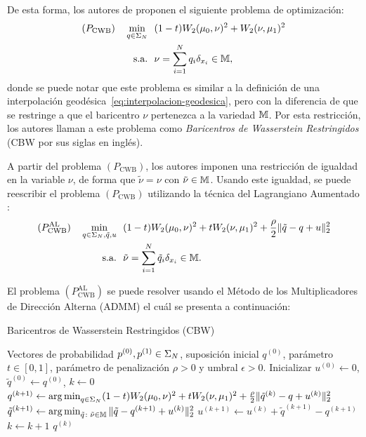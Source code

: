 De esta forma, los autores de \cite{simon2020barycenters} proponen el siguiente problema de optimización:
\begin{align*}
    (P_{\mathrm{CWB}}) \quad
    \min_{q \in \Simplex[N]} & \ \ (1-t) \Wasserstein[2]{\mu_0}{\nu}^2 + \Wasserstein[2]{\nu}{\mu_1}^2 \\
    \text{s.a.}              & \ \ \nu = \sum_{i=1}^{N} q_i \delta_{x_i} \in \bM,
\end{align*}
donde se puede notar que este problema es similar a la definición de una interpolación geodésica~\eqref{eq:interpolacion-geodesica}, pero con la diferencia de que se restringe a que el baricentro $\nu$ pertenezca a la variedad $\bM$. Por esta restricción, los autores llaman a este problema como \textit{Baricentros de Wasserstein Restringidos} (CBW por sus siglas en inglés).

A partir del problema $(P_{\mathrm{CWB}})$, los autores imponen una restricción de igualdad en la variable $\nu$, de forma que $\tilde \nu = \nu$ con $\tilde \nu \in \bM$. Usando este igualdad, se puede reescribir el problema $(P_{\mathrm{CWB}})$ utilizando la técnica del Lagrangiano Aumentado \cite[Sec. 2.3]{boyd2011distributed}:
\begin{align*}
    (P_{\mathrm{CWB}}^{\mathrm{AL}}) \quad
    \min_{q\in\Simplex[N],\tilde q,u} & \ \ (1-t) \Wasserstein[2]{\mu_0}{\nu}^2 + t \Wasserstein[2]{\nu}{\mu_1}^2
    + \frac{\rho}{2} \| \tilde q - q + u \|_2^2                                                                   \\
    \text{s.a.}                       & \ \ \tilde \nu = \sum_{i=1}^{N} \tilde q_i \delta_{x_i} \in \bM.
\end{align*}

El problema $(P_{\mathrm{CWB}}^{\mathrm{AL}})$ se puede resolver usando el Método de los Multiplicadores de Dirección Alterna (ADMM) \cite[Cap. 3]{boyd2011distributed} el cuál se presenta a continuación:

\begin{algorithm}[H]
    \caption{Baricentros de Wasserstein Restringidos (CBW)}\label{alg:ADMM-CWB}
    \begin{algorithmic}[1]
        \Require Vectores de probabilidad $p^{(0)}, p^{(1)} \in \Simplex[N]$, suposición inicial $q^{(0)}$, parámetro $t\in[0, 1]$, parámetro de penalización $\rho>0$ y umbral $\epsilon>0$.
        \State Inicializar $u^{(0)} \gets 0$, $\tilde q^{(0)} \gets q^{(0)}$, $k \gets 0$
        \Repeat
        \State $q^{(k+1)} \gets \argmin_{q\in\Simplex[N]}  (1-t) \Wasserstein[2]{\mu_0}{\nu}^2 + t\Wasserstein[2]{\nu}{\mu_1}^2 + \frac{\rho}{2} \| \tilde q^{(k)} - q + u^{(k)} \|_2^2$
        \State $\tilde q^{(k+1)} \gets \argmin_{\tilde q \colon \tilde \nu \in \bM } \| \tilde q - q^{(k+1)} + u^{(k)} \|_2^2 $
        \State $u^{(k+1)} \gets u^{(k)} + \tilde q^{(k+1)} - q^{(k+1)}$
        \State $k \gets k + 1$
        \State\Return $q^{(k)}$
    \end{algorithmic}
\end{algorithm}

